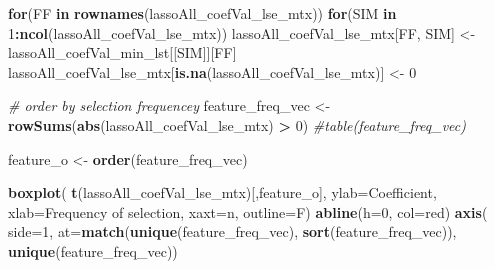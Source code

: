 \documentclass[
]{book}
\newenvironment{Shaded}{\begin{snugshade}}{\end{snugshade}}
\newcommand{\CommentTok}[1]{\textcolor[rgb]{0.56,0.35,0.01}{\textit{#1}}}
\newcommand{\ControlFlowTok}[1]{\textcolor[rgb]{0.13,0.29,0.53}{\textbf{#1}}}
\newcommand{\DataTypeTok}[1]{\textcolor[rgb]{0.13,0.29,0.53}{#1}}
\newcommand{\DecValTok}[1]{\textcolor[rgb]{0.00,0.00,0.81}{#1}}
\newcommand{\KeywordTok}[1]{\textcolor[rgb]{0.13,0.29,0.53}{\textbf{#1}}}
\newcommand{\NormalTok}[1]{#1}
\newcommand{\OperatorTok}[1]{\textcolor[rgb]{0.81,0.36,0.00}{\textbf{#1}}}
\newcommand{\StringTok}[1]{\textcolor[rgb]{0.31,0.60,0.02}{#1}}
\begin{document}
\begin{Shaded}
\begin{Highlighting}[]
\ControlFlowTok{for}\NormalTok{(FF }\ControlFlowTok{in} \KeywordTok{rownames}\NormalTok{(lassoAll\_coefVal\_lse\_mtx))}
\ControlFlowTok{for}\NormalTok{(SIM }\ControlFlowTok{in} \DecValTok{1}\OperatorTok{:}\KeywordTok{ncol}\NormalTok{(lassoAll\_coefVal\_lse\_mtx))}
\NormalTok{lassoAll\_coefVal\_lse\_mtx[FF, SIM] <{-}}\StringTok{ }\NormalTok{lassoAll\_coefVal\_min\_lst[[SIM]][FF]}
\NormalTok{lassoAll\_coefVal\_lse\_mtx[}\KeywordTok{is.na}\NormalTok{(lassoAll\_coefVal\_lse\_mtx)] <{-}}\StringTok{ }\DecValTok{0}
\end{Highlighting}
\end{Shaded}

\begin{Shaded}
\begin{Highlighting}[]
\CommentTok{\# order by selection frequencey}
\NormalTok{feature\_freq\_vec <{-}}\StringTok{ }\KeywordTok{rowSums}\NormalTok{(}\KeywordTok{abs}\NormalTok{(lassoAll\_coefVal\_lse\_mtx) }\OperatorTok{>}\StringTok{ }\DecValTok{0}\NormalTok{)}
\CommentTok{\#table(feature\_freq\_vec)}

\NormalTok{feature\_o <{-}}\StringTok{ }\KeywordTok{order}\NormalTok{(feature\_freq\_vec)}

\KeywordTok{boxplot}\NormalTok{(}
   \KeywordTok{t}\NormalTok{(lassoAll\_coefVal\_lse\_mtx)[,feature\_o], }
   \DataTypeTok{ylab=}\StringTok{\textquotesingle{}Coefficient\textquotesingle{}}\NormalTok{, }\DataTypeTok{xlab=}\StringTok{\textquotesingle{}Frequency of selection\textquotesingle{}}\NormalTok{,}
   \DataTypeTok{xaxt=}\StringTok{\textquotesingle{}n\textquotesingle{}}\NormalTok{, }
   \DataTypeTok{outline=}\NormalTok{F)}
\KeywordTok{abline}\NormalTok{(}\DataTypeTok{h=}\DecValTok{0}\NormalTok{, }\DataTypeTok{col=}\StringTok{\textquotesingle{}red\textquotesingle{}}\NormalTok{)}
\KeywordTok{axis}\NormalTok{(}
 \DataTypeTok{side=}\DecValTok{1}\NormalTok{, }
 \DataTypeTok{at=}\KeywordTok{match}\NormalTok{(}\KeywordTok{unique}\NormalTok{(feature\_freq\_vec), }\KeywordTok{sort}\NormalTok{(feature\_freq\_vec)),}
 \KeywordTok{unique}\NormalTok{(feature\_freq\_vec))}
\end{Highlighting}
\end{Shaded}
\end{document}
